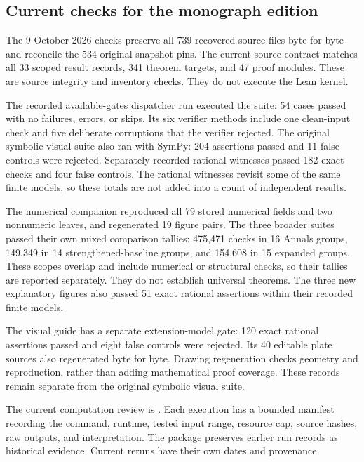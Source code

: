 \subsection{Current checks for the monograph edition}
The 9 October 2026 checks preserve all 739 recovered source files byte for byte and reconcile the 534 original snapshot pins. The current source contract matches all 33 scoped result records, 341 theorem targets, and 47 proof modules. These are source integrity and inventory checks. They do not execute the Lean kernel.

The recorded available-gates dispatcher run executed the  suite: 54 cases passed with no failures, errors, or skips. Its six verifier methods include one clean-input check and five deliberate corruptions that the verifier rejected. The original symbolic visual suite also ran with SymPy: 204 assertions passed and 11 false controls were rejected. Separately recorded rational witnesses passed 182 exact checks and four false controls. The rational witnesses revisit some of the same finite models, so these totals are not added into a count of independent results.

The numerical companion reproduced all 79 stored numerical fields and two nonnumeric leaves, and regenerated 19 figure pairs. The three broader suites passed their own mixed comparison tallies: 475,471 checks in 16 Annals groups, 149,349 in 14 strengthened-baseline groups, and 154,608 in 15 expanded groups. These scopes overlap and include numerical or structural checks, so their tallies are reported separately. They do not establish universal theorems. The three new explanatory figures also passed 51 exact rational assertions within their recorded finite models.

The visual guide has a separate extension-model gate: 120 exact rational assertions passed and eight false controls were rejected. Its 40 editable plate sources also regenerated byte for byte. Drawing regeneration checks geometry and reproduction, rather than adding mathematical proof coverage. These records remain separate from the original symbolic visual suite.

The current computation review is . Each execution has a bounded manifest recording the command, runtime, tested input range, resource cap, source hashes, raw outputs, and interpretation. The package preserves earlier run records as historical evidence. Current reruns have their own dates and provenance.

